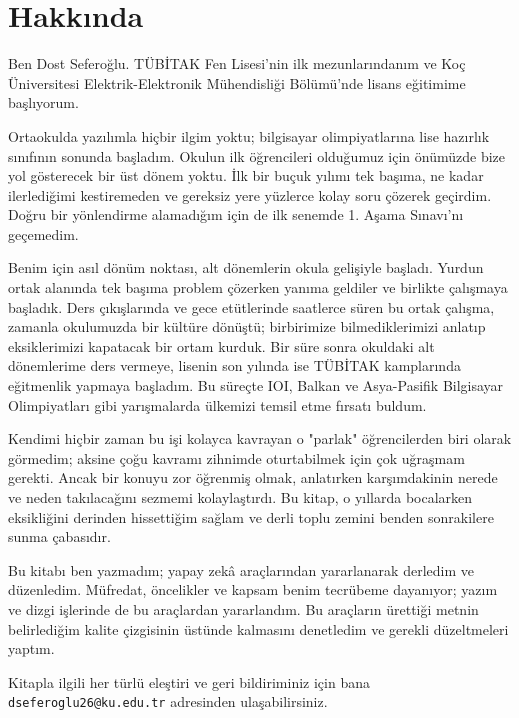 \chapter*{Hakkında}

Ben Dost Seferoğlu. TÜBİTAK Fen Lisesi'nin ilk mezunlarındanım ve Koç Üniversitesi Elektrik-Elektronik Mühendisliği Bölümü'nde lisans eğitimime başlıyorum.

Ortaokulda yazılımla hiçbir ilgim yoktu; bilgisayar olimpiyatlarına lise hazırlık sınıfının sonunda başladım. Okulun ilk öğrencileri olduğumuz için önümüzde bize yol gösterecek bir üst dönem yoktu. İlk bir buçuk yılımı tek başıma, ne kadar ilerlediğimi kestiremeden ve gereksiz yere yüzlerce kolay soru çözerek geçirdim. Doğru bir yönlendirme alamadığım için de ilk senemde 1. Aşama Sınavı'nı geçemedim.

Benim için asıl dönüm noktası, alt dönemlerin okula gelişiyle başladı. Yurdun ortak alanında tek başıma problem çözerken yanıma geldiler ve birlikte çalışmaya başladık. Ders çıkışlarında ve gece etütlerinde saatlerce süren bu ortak çalışma, zamanla okulumuzda bir kültüre dönüştü; birbirimize bilmediklerimizi anlatıp eksiklerimizi kapatacak bir ortam kurduk. Bir süre sonra okuldaki alt dönemlerime ders vermeye, lisenin son yılında ise TÜBİTAK kamplarında eğitmenlik yapmaya başladım. Bu süreçte IOI, Balkan ve Asya-Pasifik Bilgisayar Olimpiyatları gibi yarışmalarda ülkemizi temsil etme fırsatı buldum.

Kendimi hiçbir zaman bu işi kolayca kavrayan o "parlak" öğrencilerden biri olarak görmedim; aksine çoğu kavramı zihnimde oturtabilmek için çok uğraşmam gerekti. Ancak bir konuyu zor öğrenmiş olmak, anlatırken karşımdakinin nerede ve neden takılacağını sezmemi kolaylaştırdı. Bu kitap, o yıllarda bocalarken eksikliğini derinden hissettiğim sağlam ve derli toplu zemini benden sonrakilere sunma çabasıdır.

Bu kitabı ben yazmadım; yapay zekâ araçlarından yararlanarak derledim ve düzenledim. Müfredat, öncelikler ve kapsam benim tecrübeme dayanıyor; yazım ve dizgi işlerinde de bu araçlardan yararlandım. Bu araçların ürettiği metnin belirlediğim kalite çizgisinin üstünde kalmasını denetledim ve gerekli düzeltmeleri yaptım.

Kitapla ilgili her türlü eleştiri ve geri bildiriminiz için bana \texttt{dseferoglu26@\allowbreak ku.edu.\allowbreak tr} adresinden ulaşabilirsiniz.

\clearpage